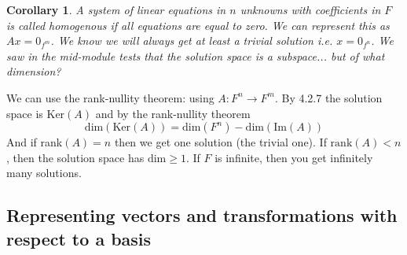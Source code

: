 \documentclass{report}
\newtheorem*{corollary}{Corollary}
\theoremstyle{remark}
\theoremstyle{definition}
\theoremstyle{definition}
\theoremstyle{theorem}
\begin{document}
\begin{corollary}
A system of linear equations in $n$ unknowns with coefficients in $F$ is called \emph{homogenous} if all equations are equal to zero. We can represent this as $Ax = 0_{f^m}$. We know we will always get at least a trivial solution i.e. $x=0_{f^n}$. We saw in the mid-module tests that the solution space is a subspace... but of what dimension?
\end{corollary}
We can use the rank-nullity theorem: using $A: F^n \rightarrow F^m$. By 4.2.7 the solution space is $\mathrm{Ker}(A)$ and by the rank-nullity theorem
\[\mathrm{dim}(\mathrm{Ker}(A))=\mathrm{dim}(F^n)-\mathrm{dim}(\mathrm{Im}(A))\]
And if rank$(A)=n$ then we get one solution (the trivial one). If $\mathrm{rank}(A)<n$, then the solution space has $\mathrm{dim} \geq 1$. If $F$ is infinite, then you get infinitely many solutions.

\subsection{Representing vectors and transformations with respect to a basis}
\end{document}
